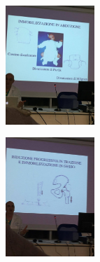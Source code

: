 \begin{figure}[!ht]
\centering
\includegraphics[width=0.3\textwidth]{018/image15.jpeg}
\end{figure}

\begin{figure}[!ht]
\centering
\includegraphics[width=0.3\textwidth]{018/image16.jpeg}
\end{figure}
